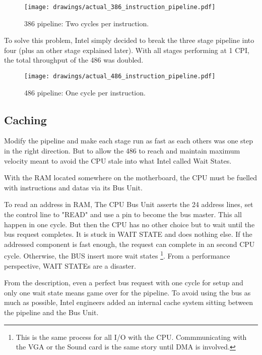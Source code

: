 \begin{figure}[H]
\centering
\texttt{[image: drawings/actual\_386\_instruction\_pipeline.pdf]}
\caption{386 pipeline: Two cycles per instruction.}
\end{figure}
\bigskip
\par
To solve this problem, Intel simply decided to break the three stage pipeline into four (plus an other stage explained later). With all stages performing at 1 CPI, the total throughput of the 486 was doubled.\\
\begin{figure}[H]
\centering
\texttt{[image: drawings/actual\_486\_instruction\_pipeline.pdf]}
\caption{486 pipeline: One cycle per instruction.}
\end{figure}
\par





\subsection{Caching }
Modify the pipeline and make each stage run as fast as each others was one step in the right direction. But to allow the 486 to reach and maintain maximum velocity meant to avoid the CPU stale into what Intel called Wait States.\\
\par
With the RAM located somewhere on the motherboard, the CPU must be fuelled with instructions and datas via its Bus Unit.\\
\par
{}
\par
To read an address in RAM, The CPU Bus Unit asserts the 24 address lines, set the control line to "READ" and use a pin to become the bus master. This all happen in one cycle. But then the CPU has no other choice but to wait until the bus request completes. It is stuck in WAIT STATE and does nothing else. If the addressed component is fast enough, the request can complete in an second CPU cycle. Otherwise, the BUS insert more wait states \footnote{This is the same process for all I/O with the CPU. Commmunicating with the VGA or the Sound card is the same story until DMA is involved.}. From a performance perspective, WAIT STATEs are a disaster.\\
\par
{}
From the description, even a perfect bus request with one cycle for setup and only one wait state means game over for the pipeline. To avoid using the bus as much as possible, Intel engineers added an internal cache system sitting between the pipeline and the Bus Unit.\\
\par
{}

